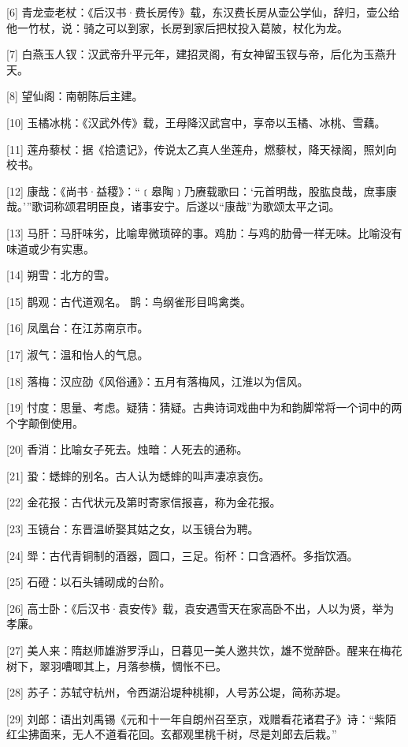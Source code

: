 \documentclass[12pt,UTF8]{ctexbook}
\begin{document}
[6] 青龙壶老杖：《后汉书·费长房传》载，东汉费长房从壶公学仙，辞归，壶公给他一竹杖，说：骑之可以到家，长房到家后把杖投入葛陂，杖化为龙。

[7] 白燕玉人钗：汉武帝升平元年，建招灵阁，有女神留玉钗与帝，后化为玉燕升天。

[8] 望仙阁：南朝陈后主建。


[10] 玉橘冰桃：《汉武外传》载，王母降汉武宫中，享帝以玉橘、冰桃、雪藕。

[11] 莲舟藜杖：据《拾遗记》，传说太乙真人坐莲舟，燃藜杖，降天禄阁，照刘向校书。

[12] 康哉：《尚书·益稷》：“﹝皋陶﹞乃赓载歌曰：‘元首明哉，股肱良哉，庶事康哉。’”歌词称颂君明臣良，诸事安宁。后遂以“康哉”为歌颂太平之词。

[13] 马肝：马肝味劣，比喻卑微琐碎的事。鸡肋：与鸡的肋骨一样无味。比喻没有味道或少有实惠。

[14] 朔雪：北方的雪。

[15] 鹊观：古代道观名。 鹊：鸟纲雀形目鸣禽类。

[16] 凤凰台：在江苏南京市。

[17] 淑气：温和怡人的气息。

[18] 落梅：汉应劭《风俗通》：五月有落梅风，江淮以为信风。

[19] 忖度：思量、考虑。疑猜：猜疑。古典诗词戏曲中为和韵脚常将一个词中的两个字颠倒使用。

[20] 香消：比喻女子死去。烛暗：人死去的通称。

[21] 蛩：蟋蟀的别名。古人认为蟋蟀的叫声凄凉哀伤。

[22] 金花报：古代状元及第时寄家信报喜，称为金花报。

[23] 玉镜台：东晋温峤娶其姑之女，以玉镜台为聘。

[24] 斝：古代青铜制的酒器，圆口，三足。衔杯：口含酒杯。多指饮酒。

[25] 石磴：以石头铺砌成的台阶。

[26] 高士卧：《后汉书·袁安传》载，袁安遇雪天在家高卧不出，人以为贤，举为孝廉。

[27] 美人来：隋赵师雄游罗浮山，日暮见一美人邀共饮，雄不觉醉卧。醒来在梅花树下，翠羽嘈唧其上，月落参横，惆怅不已。

[28] 苏子：苏轼守杭州，令西湖沿堤种桃柳，人号苏公堤，简称苏堤。

[29] 刘郎：语出刘禹锡《元和十一年自朗州召至京，戏赠看花诸君子》诗：“紫陌红尘拂面来，无人不道看花回。玄都观里桃千树，尽是刘郎去后栽。”
\end{document}
